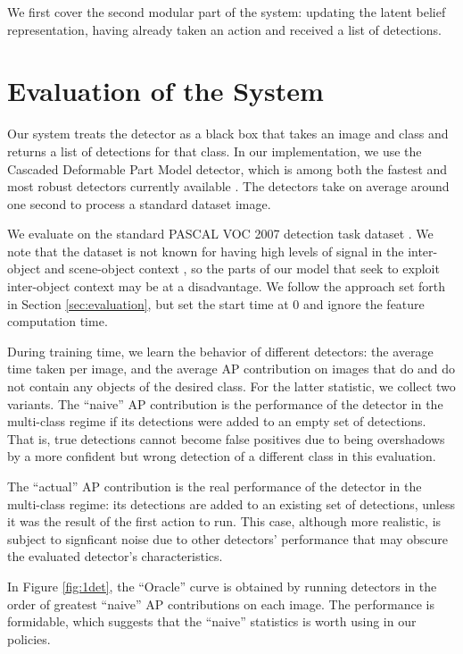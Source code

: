 We first cover the second modular part of the system: updating the latent belief representation, having already taken an action and received a list of detections.





\section{Evaluation of the System} \label{sec:actual-evaluation}
Our system treats the detector as a black box that takes an image and class and returns a list of detections for that class.
In our implementation, we use the Cascaded Deformable Part Model detector, which is among both the fastest and most robust detectors currently available \cite{Felzenszwalb2010a}.
The detectors take on average around one second to process a standard dataset image.

We evaluate on the standard PASCAL VOC 2007 detection task dataset \cite{pascal-voc-2010}.
We note that the dataset is not known for having high levels of signal in the inter-object and scene-object context \cite{Divvala2009}, so the parts of our model that seek to exploit inter-object context may be at a disadvantage.
We follow the approach set forth in Section \ref{sec:evaluation}, but set the start time at $0$ and ignore the feature computation time.

During training time, we learn the behavior of different detectors: the average time taken per image, and the average AP contribution on images that do and do not contain any objects of the desired class.
For the latter statistic, we collect two variants.
The ``naive'' AP contribution is the performance of the detector in the multi-class regime if its detections were added to an empty set of detections.
That is, true detections cannot become false positives due to being overshadows by a more confident but wrong detection of a different class in this evaluation.

The ``actual'' AP contribution is the real performance of the detector in the multi-class regime: its detections are added to an existing set of detections, unless it was the result of the first action to run.
This case, although more realistic, is subject to signficant noise due to other detectors' performance that may obscure the evaluated detector's characteristics.

In Figure \ref{fig:1det}, the ``Oracle'' curve is obtained by running detectors in the order of greatest ``naive'' AP contributions on each image.
The performance is formidable, which suggests that the ``naive'' statistics is worth using in our policies.

